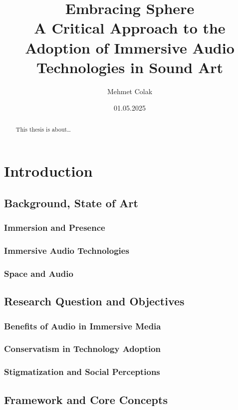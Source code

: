 \documentclass[a4paper, 12pt]{report}
\author{Mehmet Colak}
\title{Embracing Sphere \\[1ex] \large 
    A Critical Approach to the Adoption of Immersive Audio Technologies in Sound Art}
\date{01.05.2025}
\begin{document}
\maketitle
\tableofcontents
\listoffigures
\listoftables

\begin{abstract}
    This thesis is about\ldots
\end{abstract}

\newpage



\chapter{Introduction}
    \section{Background, State of Art}
        \subsection{Immersion and Presence}
        \subsection{Immersive Audio Technologies}
        \subsection{Space and Audio}
    \section{Research Question and Objectives}
        \subsection{Benefits of Audio in Immersive Media}
        \subsection{Conservatism in Technology Adoption}
        \subsection{Stigmatization and Social Perceptions}
    \section{Framework and Core Concepts}
\end{document}
